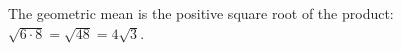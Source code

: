 The geometric mean is the positive square root of the product: $\sqrt{6\cdot8}=\sqrt{48}=\boxed{4\sqrt3}$.
